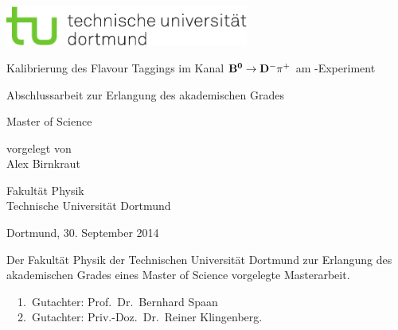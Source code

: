 
\begin{titlepage}
\includegraphics[width=8cm]{tud-logo-cmyk.pdf}
\vspace*{15ex}
{%
\Huge \sffamily \bfseries 
\begin{center}
Kalibrierung des Flavour Taggings im Kanal $\mathbf{{{B}^0}\rightarrow{\ensuremath{{D}^-}}{\ensuremath{{\pi}^+}}}$ am \lhcb-Experiment
\end{center} 
}%

\begin{otherlanguage}{german}
{%
\LARGE \sffamily %
\begin{center}
Abschlussarbeit zur Erlangung des akademischen Grades\\
\end{center}
}

{%
\LARGE \sffamily %
\begin{center}
Master of Science
\end{center}
}

\vspace{5ex}


{%
\Large \sffamily
\begin{center}
vorgelegt von \\[0.8ex]
Alex Birnkraut 
\end{center}
}
\vspace{5ex}
{%
\Large \sffamily
\begin{center}
Fakultät Physik\\
Technische Universität Dortmund
\end{center}
}
\vspace{4ex}
{%
\Large \sffamily
\begin{center}
Dortmund, 30. September 2014
\end{center}
}

\clearpage
\thispagestyle{empty}
\vspace*{\fill}
\noindent Der Fakultät Physik der Technischen Universität Dortmund zur Erlangung
des akademischen Grades eines Master of Science vorgelegte
Masterarbeit.\\

\parbox{\textwidth}{
  1.~Gutachter: Prof.~Dr.~Bernhard Spaan \\
  2.~Gutachter: Priv.-Doz.~Dr.~Reiner Klingenberg.\\
}
\end{otherlanguage}
\end{titlepage}
\setcounter{page}{1}